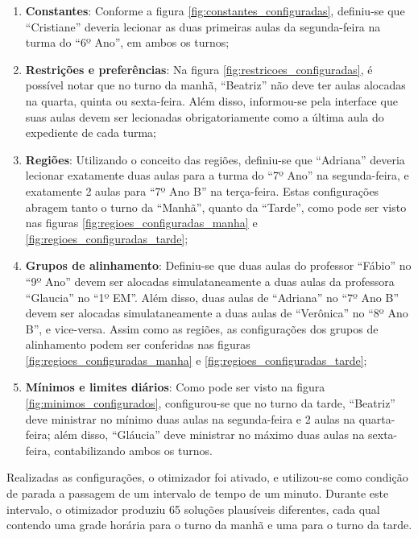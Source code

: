 \newpage
\begin{enumerate}
	\item \label{item_constantes} \textbf{Constantes}: Conforme a figura \ref{fig:constantes_configuradas}, definiu-se que ``Cristiane'' deveria lecionar as duas primeiras aulas da segunda-feira na turma do ``6º Ano'', em ambos os turnos;
	\item \label{item_restricoes} \textbf{Restrições e preferências}: Na figura \ref{fig:restricoes_configuradas}, é possível notar que no turno da manhã, ``Beatriz'' não deve ter aulas alocadas na quarta, quinta ou sexta-feira. Além disso, informou-se pela interface que suas aulas devem ser lecionadas obrigatoriamente como a última aula do expediente de cada turma;
	\item \label{item_regioes} \textbf{Regiões}: Utilizando o conceito das regiões, definiu-se que ``Adriana'' deveria lecionar exatamente duas aulas para a turma do ``7º Ano'' na segunda-feira, e exatamente 2 aulas para ``7º Ano B'' na terça-feira. Estas configurações abragem tanto o turno da ``Manhã'', quanto da ``Tarde'', como pode ser visto nas figuras \ref{fig:regioes_configuradas_manha} e \ref{fig:regioes_configuradas_tarde};
	\item \label{item_grupos} \textbf{Grupos de alinhamento}: Definiu-se que duas aulas do professor ``Fábio'' no ``9º Ano'' devem ser alocadas simulataneamente a duas aulas da professora ``Glaucia'' no ``1º EM''. Além disso, duas aulas de ``Adriana'' no ``7º Ano B'' devem ser alocadas simulataneamente a duas aulas de ``Verônica'' no ``8º Ano B'', e vice-versa. Assim como as regiões, as configurações dos grupos de alinhamento podem ser conferidas nas figuras \ref{fig:regioes_configuradas_manha} e \ref{fig:regioes_configuradas_tarde};
	\item \label{item_minimos} \textbf{Mínimos e limites diários}: Como pode ser visto na figura \ref{fig:minimos_configurados}, configurou-se que no turno da tarde, ``Beatriz'' deve ministrar no mínimo duas aulas na segunda-feira e 2 aulas na quarta-feira; além disso, ``Gláucia'' deve ministrar no máximo duas aulas na sexta-feira, contabilizando ambos os turnos.
\end{enumerate}

Realizadas as configurações, o otimizador foi ativado, e utilizou-se como condição de parada a passagem de um intervalo de tempo de um minuto. Durante este intervalo, o otimizador produziu 65 soluções plausíveis diferentes, cada qual contendo uma grade horária para o turno da manhã e uma para o turno da tarde.

